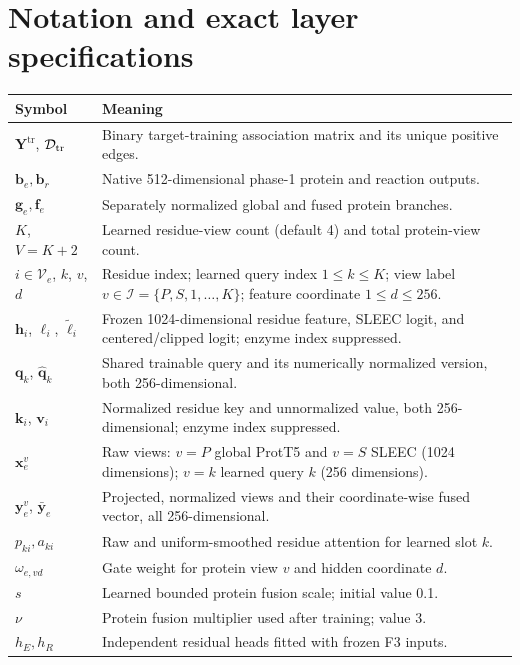 \section{Notation and exact layer specifications}
\label{app:v4-layers}
\begin{longtable}{>{\raggedright\arraybackslash}p{}>{\raggedright\arraybackslash}p{}}
\toprule
Symbol & Meaning\\
\midrule
\endhead
$\mathbf{Y}^{\mathrm{tr}}$, $\mathcal{D}_{\mathrm{tr}}$ & Binary target-training association matrix and its unique positive edges.\\
$\mathbf{b}_e,\mathbf{b}_r$ & Native 512-dimensional phase-1 protein and reaction outputs.\\
$\mathbf{g}_e,\mathbf{f}_e$ & Separately normalized global and fused protein branches.\\
$K$, $V=K+2$ & Learned residue-view count (default 4) and total protein-view count.\\
$i\in\mathcal V_e$, $k$, $v$, $d$ & Residue index; learned query index $1\le k\le K$; view label $v\in\mathcal I=\{P,S,1,\ldots,K\}$; feature coordinate $1\le d\le256$.\\
$\mathbf h_i$, $\ell_i$, $\tilde\ell_i$ & Frozen 1024-dimensional residue feature, SLEEC logit, and centered/clipped logit; enzyme index suppressed.\\
$\mathbf q_k$, $\hat{\mathbf q}_k$ & Shared trainable query and its numerically normalized version, both 256-dimensional.\\
$\mathbf k_i$, $\mathbf v_i$ & Normalized residue key and unnormalized value, both 256-dimensional; enzyme index suppressed.\\
$\mathbf x_e^{v}$ & Raw views: $v=P$ global ProtT5 and $v=S$ SLEEC (1024 dimensions); $v=k$ learned query $k$ (256 dimensions).\\
$\mathbf y_e^{v}$, $\bar{\mathbf y}_e$ & Projected, normalized views and their coordinate-wise fused vector, all 256-dimensional.\\
$p_{ki},a_{ki}$ & Raw and uniform-smoothed residue attention for learned slot $k$.\\
$\omega_{e,vd}$ & Gate weight for protein view $v$ and hidden coordinate $d$.\\
$s$ & Learned bounded protein fusion scale; initial value 0.1.\\
$\nu$ & Protein fusion multiplier used after training; value 3.\\
$h_E,h_R$ & Independent residual heads fitted with frozen F3 inputs.\\

\end{longtable}
